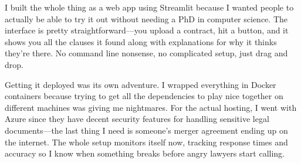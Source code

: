 I built the whole thing as a web app using Streamlit because I wanted people to actually be able to try it out without needing a PhD in computer science. The interface is pretty straightforward—you upload a contract, hit a button, and it shows you all the clauses it found along with explanations for why it thinks they're there. No command line nonsense, no complicated setup, just drag and drop.

Getting it deployed was its own adventure. I wrapped everything in Docker containers because trying to get all the dependencies to play nice together on different machines was giving me nightmares. For the actual hosting, I went with Azure since they have decent security features for handling sensitive legal documents—the last thing I need is someone's merger agreement ending up on the internet. The whole setup monitors itself now, tracking response times and accuracy so I know when something breaks before angry lawyers start calling.